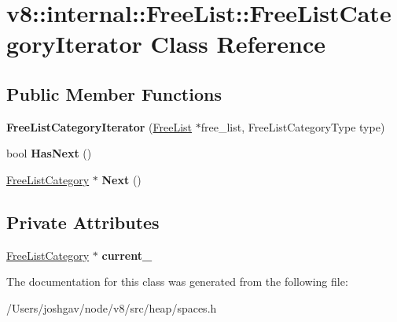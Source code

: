 \hypertarget{classv8_1_1internal_1_1_free_list_1_1_free_list_category_iterator}{}\section{v8\+:\+:internal\+:\+:Free\+List\+:\+:Free\+List\+Category\+Iterator Class Reference}
\label{classv8_1_1internal_1_1_free_list_1_1_free_list_category_iterator}
\subsection*{Public Member Functions}
\begin{DoxyCompactItemize}
\item 
{\bfseries Free\+List\+Category\+Iterator} (\hyperlink{classv8_1_1internal_1_1_free_list}{Free\+List} $\ast$free\+\_\+list, Free\+List\+Category\+Type type)\hypertarget{classv8_1_1internal_1_1_free_list_1_1_free_list_category_iterator_af6f54d67384a9d10fcbb7311b3691d76}{}\label{classv8_1_1internal_1_1_free_list_1_1_free_list_category_iterator_af6f54d67384a9d10fcbb7311b3691d76}

\item 
bool {\bfseries Has\+Next} ()\hypertarget{classv8_1_1internal_1_1_free_list_1_1_free_list_category_iterator_a64647fee0eee1dea1f440fab676b71d0}{}\label{classv8_1_1internal_1_1_free_list_1_1_free_list_category_iterator_a64647fee0eee1dea1f440fab676b71d0}

\item 
\hyperlink{classv8_1_1internal_1_1_free_list_category}{Free\+List\+Category} $\ast$ {\bfseries Next} ()\hypertarget{classv8_1_1internal_1_1_free_list_1_1_free_list_category_iterator_a43d7825d0a0479b8cfdd2fe9c6d47874}{}\label{classv8_1_1internal_1_1_free_list_1_1_free_list_category_iterator_a43d7825d0a0479b8cfdd2fe9c6d47874}

\end{DoxyCompactItemize}
\subsection*{Private Attributes}
\begin{DoxyCompactItemize}
\item 
\hyperlink{classv8_1_1internal_1_1_free_list_category}{Free\+List\+Category} $\ast$ {\bfseries current\+\_\+}\hypertarget{classv8_1_1internal_1_1_free_list_1_1_free_list_category_iterator_add90affe501fcb59af752b2047712535}{}\label{classv8_1_1internal_1_1_free_list_1_1_free_list_category_iterator_add90affe501fcb59af752b2047712535}

\end{DoxyCompactItemize}


The documentation for this class was generated from the following file\+:\begin{DoxyCompactItemize}
\item 
/\+Users/joshgav/node/v8/src/heap/spaces.\+h\end{DoxyCompactItemize}
